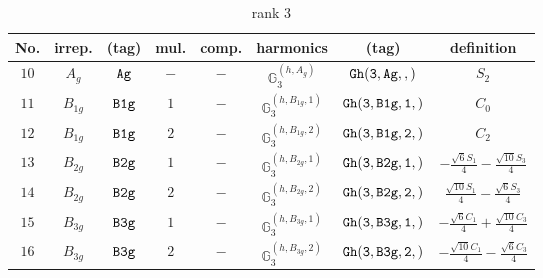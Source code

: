\documentclass[fleqn,8pt]{jsarticle}
\begin{document}
\begin{table}[ht!]
\begin{center}
\caption{rank 3}
\renewcommand{\arraystretch}{1.3}
\begin{tabular}{cccccccc} \hline \hline
No. & irrep. & (tag) & mul. & comp. & harmonics & (tag) & definition \\ \hline
$ 10 $ & $ A_{g} $ & $ {\tt Ag} $ & $ - $ & $ - $ & $ \mathbb{G}_{3}^{(h,A_{g})} $ & $ {\tt Gh(3,Ag,,)} $ & $ S_{2} $ \\
$ 11 $ & $ B_{1g} $ & $ {\tt B1g} $ & $ 1 $ & $ - $ & $ \mathbb{G}_{3}^{(h,B_{1g},1)} $ & $ {\tt Gh(3,B1g,1,)} $ & $ C_{0} $ \\
$ 12 $ & $ B_{1g} $ & $ {\tt B1g} $ & $ 2 $ & $ - $ & $ \mathbb{G}_{3}^{(h,B_{1g},2)} $ & $ {\tt Gh(3,B1g,2,)} $ & $ C_{2} $ \\
$ 13 $ & $ B_{2g} $ & $ {\tt B2g} $ & $ 1 $ & $ - $ & $ \mathbb{G}_{3}^{(h,B_{2g},1)} $ & $ {\tt Gh(3,B2g,1,)} $ & $ - \frac{\sqrt{6} S_{1}}{4} - \frac{\sqrt{10} S_{3}}{4} $ \\
$ 14 $ & $ B_{2g} $ & $ {\tt B2g} $ & $ 2 $ & $ - $ & $ \mathbb{G}_{3}^{(h,B_{2g},2)} $ & $ {\tt Gh(3,B2g,2,)} $ & $ \frac{\sqrt{10} S_{1}}{4} - \frac{\sqrt{6} S_{3}}{4} $ \\
$ 15 $ & $ B_{3g} $ & $ {\tt B3g} $ & $ 1 $ & $ - $ & $ \mathbb{G}_{3}^{(h,B_{3g},1)} $ & $ {\tt Gh(3,B3g,1,)} $ & $ - \frac{\sqrt{6} C_{1}}{4} + \frac{\sqrt{10} C_{3}}{4} $ \\
$ 16 $ & $ B_{3g} $ & $ {\tt B3g} $ & $ 2 $ & $ - $ & $ \mathbb{G}_{3}^{(h,B_{3g},2)} $ & $ {\tt Gh(3,B3g,2,)} $ & $ - \frac{\sqrt{10} C_{1}}{4} - \frac{\sqrt{6} C_{3}}{4} $ \\
 \hline \hline
\end{tabular}
\end{center}
\end{table}
\end{document}
